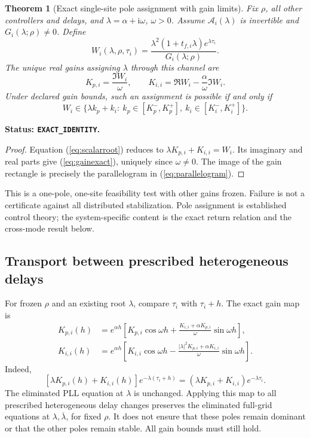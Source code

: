\documentclass[11pt]{article}
\newtheorem{theorem}{Theorem}
\newcommand{\ii}{\mathrm{i}}
\newcommand{\status}[1]{\par\smallskip\noindent\textbf{Status: \texttt{#1}.}\ }
\begin{document}
\begin{theorem}[Exact single-site pole assignment with gain limits]
Fix $\rho$, all other controllers and delays, and
$\lambda=\alpha+\ii\omega$, $\omega>0$.
Assume $\mathcal A_i(\lambda)$ is invertible and
$G_i(\lambda;\rho)\ne0$. Define
\[
 W_i(\lambda,\rho,\tau_i)=
 \frac{\lambda^2(1+t_{f,i}\lambda)e^{\lambda\tau_i}}
 {G_i(\lambda;\rho)} .
\]
The unique real gains assigning $\lambda$ through this channel are
\begin{equation}
 \boxed{K_{p,i}=\frac{\Im W_i}{\omega},\qquad
 K_{i,i}=\Re W_i-\frac{\alpha}{\omega}\Im W_i .} \label{eq:gainexact}
\end{equation}
Under declared gain bounds, such an assignment is possible if and only if
\begin{equation}
 W_i\in\{\lambda k_p+k_i:\ k_p\in[K_p^-,K_p^+],\
                              k_i\in[K_i^-,K_i^+]\}. \label{eq:parallelogram}
\end{equation}
\end{theorem}
\status{EXACT\_IDENTITY}
\begin{proof}
Equation (\ref{eq:scalarroot}) reduces to
$\lambda K_{p,i}+K_{i,i}=W_i$.
Its imaginary and real parts give (\ref{eq:gainexact}), uniquely since
$\omega\ne0$. The image of the gain rectangle is precisely the
parallelogram in (\ref{eq:parallelogram}).
\end{proof}
This is a one-pole, one-site feasibility test with other gains frozen.
Failure is not a certificate against all distributed stabilization.
Pole assignment is established control theory; the system-specific
content is the exact return relation and the cross-mode result below.

\subsection{Transport between prescribed heterogeneous delays}
For frozen $\rho$ and an existing root $\lambda$, compare
$\tau_i$ with $\tau_i+h$. The exact gain map is
\begin{align}
 K_{p,i}(h)&=e^{\alpha h}\left[K_{p,i}\cos\omega h+
 \frac{K_{i,i}+\alpha K_{p,i}}{\omega}\sin\omega h\right],\\
 K_{i,i}(h)&=e^{\alpha h}\left[K_{i,i}\cos\omega h-
 \frac{|\lambda|^2K_{p,i}+\alpha K_{i,i}}{\omega}\sin\omega h\right].
 \label{eq:transport}
\end{align}
Indeed,
\[
 [\lambda K_{p,i}(h)+K_{i,i}(h)]e^{-\lambda(\tau_i+h)}
 =(\lambda K_{p,i}+K_{i,i})e^{-\lambda\tau_i}.
\]
The eliminated PLL equation at $\lambda$ is unchanged.
Applying this map to all prescribed heterogeneous delay changes
preserves the eliminated full-grid equations at
$\lambda,\overline\lambda$, for fixed $\rho$.
It does not ensure that these poles remain dominant or that the
other poles remain stable. All gain bounds must still hold.
\end{document}
